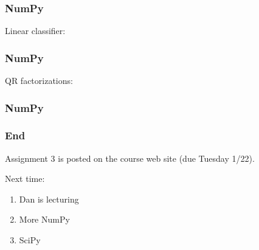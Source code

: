 \documentclass{beamer}
\begin{document}
\begin{frame}
\frametitle{NumPy}
\end{frame}


\begin{frame}
Linear classifier:
\frametitle{NumPy}
\end{frame}


\begin{frame}
QR factorizations:
\frametitle{NumPy}
\end{frame}

\begin{frame}
\frametitle{End}

Assignment 3 is posted on the course web site (due Tuesday 1/22).

\vspace{0.2in}

Next time:
\begin{enumerate}
\setlength{\itemsep}{0.05in}
\item{Dan is lecturing}
\item{More NumPy}
\item{SciPy}
\end{enumerate}

\end{frame}
\end{document}
